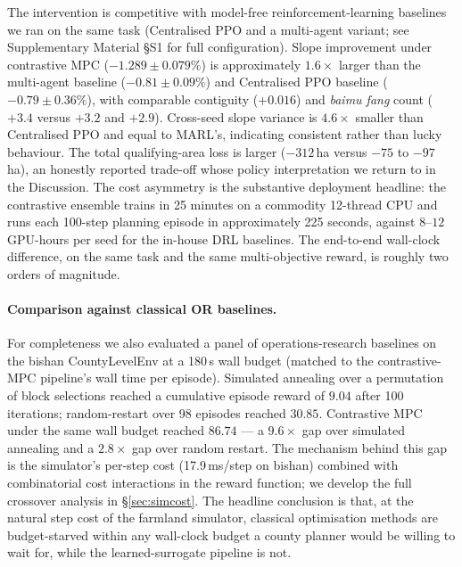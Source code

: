 \documentclass[11pt]{article}
\begin{document}
The intervention is competitive with model-free reinforcement-learning baselines we ran on the same task (Centralised PPO and a multi-agent variant; see Supplementary Material \S S1 for full configuration). Slope improvement under contrastive MPC ($-1.289 \pm 0.079\%$) is approximately $1.6\times$ larger than the multi-agent baseline ($-0.81 \pm 0.09\%$) and Centralised PPO baseline ($-0.79 \pm 0.36\%$), with comparable contiguity ($+0.016$) and \textit{baimu fang} count ($+3.4$ versus $+3.2$ and $+2.9$). Cross-seed slope variance is $4.6\times$ smaller than Centralised PPO and equal to MARL's, indicating consistent rather than lucky behaviour. The total qualifying-area loss is larger ($-312$\,ha versus $-75$ to $-97$\,ha), an honestly reported trade-off whose policy interpretation we return to in the Discussion. The cost asymmetry is the substantive deployment headline: the contrastive ensemble trains in 25 minutes on a commodity 12-thread CPU and runs each 100-step planning episode in approximately 225 seconds, against $8$--$12$ GPU-hours per seed for the in-house DRL baselines. The end-to-end wall-clock difference, on the same task and the same multi-objective reward, is roughly two orders of magnitude.

\paragraph{Comparison against classical OR baselines.} For completeness we also evaluated a panel of operations-research baselines on the bishan CountyLevelEnv at a 180\,s wall budget (matched to the contrastive-MPC pipeline's wall time per episode). Simulated annealing over a permutation of block selections reached a cumulative episode reward of $9.04$ after 100 iterations; random-restart over 98 episodes reached $30.85$. Contrastive MPC under the same wall budget reached $86.74$ — a $9.6\times$ gap over simulated annealing and a $2.8\times$ gap over random restart. The mechanism behind this gap is the simulator's per-step cost (17.9\,ms/step on bishan) combined with combinatorial cost interactions in the reward function; we develop the full crossover analysis in \S\ref{sec:simcost}. The headline conclusion is that, at the natural step cost of the farmland simulator, classical optimisation methods are budget-starved within any wall-clock budget a county planner would be willing to wait for, while the learned-surrogate pipeline is not.
\end{document}
